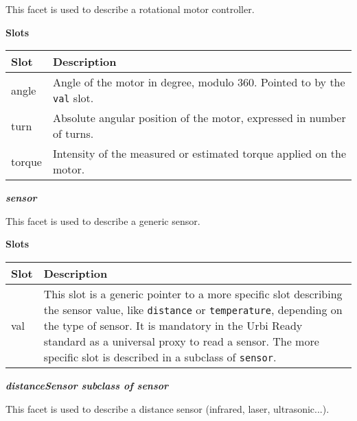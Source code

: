\documentclass[a4paper]{article}
\begin{document}
{\sffamily
This facet is used to describe a rotational motor controller.}

{\sffamily\bfseries
Slots}

\begin{flushleft}
\tablehead{}
\begin{supertabular}{|m{2.8669999cm}|m{12.422cm}|}
\hline
{}\sffamily\bfseries Slot &
\sffamily\bfseries Description\\\hline
{} angle &
\sffamily Angle of the motor in degree, modulo
360. Pointed to by the \texttt{val} slot.\\\hline
{} turn &
\sffamily Absolute angular position of the
motor, expressed in number of turns.\\\hline
{} torque &
\sffamily Intensity of the measured or estimated
torque applied on the motor.\\\hline
\end{supertabular}
\end{flushleft}
{\sffamily\bfseries\itshape
sensor}

{\sffamily
This facet is used to describe a generic sensor.}

{\sffamily\bfseries
Slots}

\begin{flushleft}
\tablehead{}
\begin{supertabular}{|m{2.8669999cm}|m{12.422cm}|}
\hline
{}\sffamily\bfseries Slot &
\sffamily\bfseries Description\\\hline
{} val &
\sffamily This slot is a generic pointer to a
more specific slot describing the sensor value, like \texttt{distance}
or \texttt{temperature}, depending on the type of sensor. It is
mandatory in the Urbi Ready standard as a universal proxy to read a
sensor. The more specific slot is described in a subclass of
\texttt{sensor}.\\\hline
\end{supertabular}
\end{flushleft}
{\sffamily\bfseries\itshape
 distanceSensor  \textmd{subclass of sensor}}

{\sffamily
This facet is used to describe a distance sensor (infrared, laser,
ultrasonic...).}
\end{document}
